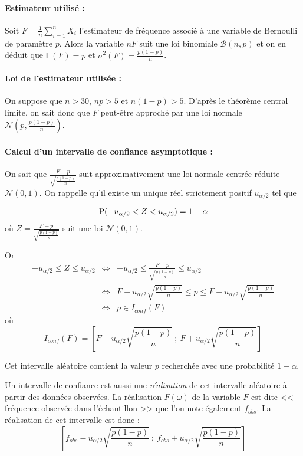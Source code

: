 \paragraph{Estimateur utilisé :} Soit $F=\frac{1}{n}\sum_{i=1}^n X_i$ l'estimateur de fréquence associé à une variable de Bernoulli de paramètre $p$. Alors la variable $nF$ suit une loi binomiale $\mathscr{B}(n,p)$ et on en déduit que  $\mathbb{E}(F)=p$
et $\sigma^2(F) = \frac{p(1-p)}{n}$.

\paragraph{Loi de l'estimateur utilisée :}  On suppose que $n>30$, $np>5$ et $n(1-p)>5$. D'après le théorème central limite, on sait donc que $F$ peut-être approché par une loi normale $\mathcal{N}\left(p,\frac{p(1-p)}{n}\right)$. 

\paragraph{Calcul d'un intervalle de confiance asymptotique :}  On sait que $\frac{F-p}{\sqrt{\frac{p(1-p)}{n}}}$ suit approximativement une loi normale centrée réduite $\mathcal{N}(0,1)$. On rappelle qu'il existe un unique réel strictement positif $u_{\alpha/2}$ tel que 

$$\operatorname{P}(-u_{\alpha/2} < Z < u_{\alpha/2}) = 1-\alpha$$
où $Z=\frac{F-p}{\sqrt{\frac{p(1-p)}{n}}}$ suit une loi $\mathcal{N}(0,1)$.

Or \begin{eqnarray*}
	-u_{\alpha/2} \leq Z \leq u_{\alpha/2} & \iff & -u_{\alpha/2} \leq \frac{F-p}{\sqrt{\frac{p(1-p)}{n}}} \leq u_{\alpha/2} \\
	& \iff & F-u_{\alpha/2} {\sqrt{\frac{p(1-p)}{n}}}  \leq p \leq F + u_{\alpha/2}{\sqrt{\frac{p(1-p)}{n}}} \\
	& \iff & p \in I_{conf}(F)
\end{eqnarray*}
où $$I_{conf}(F)=\left[F-u_{\alpha/2} {\sqrt{\frac{p(1-p)}{n}}} ~;~ F + u_{\alpha/2}{\sqrt{\frac{p(1-p)}{n}}} \right]$$ 

Cet intervalle aléatoire contient la valeur $p$ recherchée avec une probabilité $1-\alpha$. 

Un intervalle de confiance est aussi une \textit{réalisation} de cet intervalle aléatoire à partir des données observées. La réalisation $F(\omega)$ de la variable $F$ est dite << fréquence observée dans l'échantillon >> que l'on note également $f_{obs}$. La réalisation de cet intervalle est donc :
$$\left[f_{obs}-u_{\alpha/2} {\sqrt{\frac{p(1-p)}{n}}} ~;~ f_{obs} + u_{\alpha/2}{\sqrt{\frac{p(1-p)}{n}}} \right]$$

